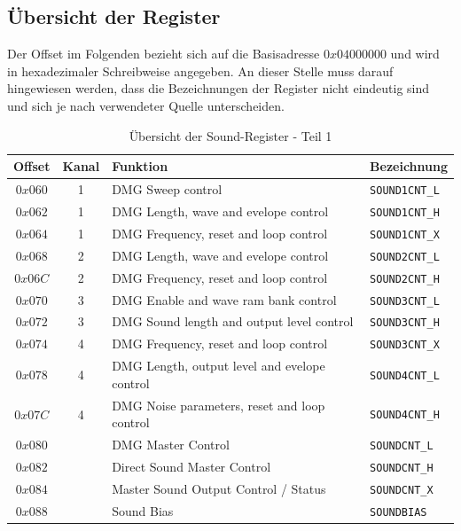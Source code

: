 \documentclass[11pt,a4paper]{scrartcl}
\begin{document}
\subsection{\"Ubersicht der Register}

Der Offset im Folgenden bezieht sich auf die Basisadresse $0x04000000$ und wird in hexadezimaler Schreibweise angegeben. An dieser Stelle muss darauf hingewiesen werden, dass die Bezeichnungen der Register nicht eindeutig sind und sich je nach verwendeter Quelle unterscheiden.

\begin{table}[h]
    \centering
    \begin{tabular}{ c | c | p{10cm} | l }
        \textbf{Offset} & \textbf{Kanal} & \textbf{Funktion} & \textbf{Bezeichnung} \\
        \hline
        $0x060$ & 1 & DMG Sweep control & \verb|SOUND1CNT_L| \\
        \hline
        $0x062$ & 1 & DMG Length, wave and evelope control & \verb|SOUND1CNT_H| \\
        \hline
        $0x064$ & 1 & DMG Frequency, reset and loop control & \verb|SOUND1CNT_X| \\
        \hline
        $0x068$ & 2 & DMG Length, wave and evelope control & \verb|SOUND2CNT_L| \\
        \hline
        $0x06C$ & 2 & DMG Frequency, reset and loop control & \verb|SOUND2CNT_H| \\
        \hline
        $0x070$ & 3 & DMG Enable and wave ram bank control & \verb|SOUND3CNT_L| \\
        \hline
        $0x072$ & 3 & DMG Sound length and output level control & \verb|SOUND3CNT_H| \\
        \hline
        $0x074$ & 4 & DMG Frequency, reset and loop control & \verb|SOUND3CNT_X| \\
        \hline
        $0x078$ & 4 & DMG Length, output level and evelope control & \verb|SOUND4CNT_L| \\
        \hline
        $0x07C$ & 4 & DMG Noise parameters, reset and loop control & \verb|SOUND4CNT_H| \\
        \hline
        $0x080$ & & DMG Master Control & \verb|SOUNDCNT_L| \\
        \hline
        $0x082$ & & Direct Sound Master Control & \verb|SOUNDCNT_H| \\
        \hline
        $0x084$ & & Master Sound Output Control / Status & \verb|SOUNDCNT_X| \\
        \hline
        $0x088$ & & Sound Bias & \verb|SOUNDBIAS| \\
    \end{tabular}
    \caption{\"Ubersicht der Sound-Register - Teil 1}
    \label{table:SoundRegister1}
\end{table}
\end{document}
